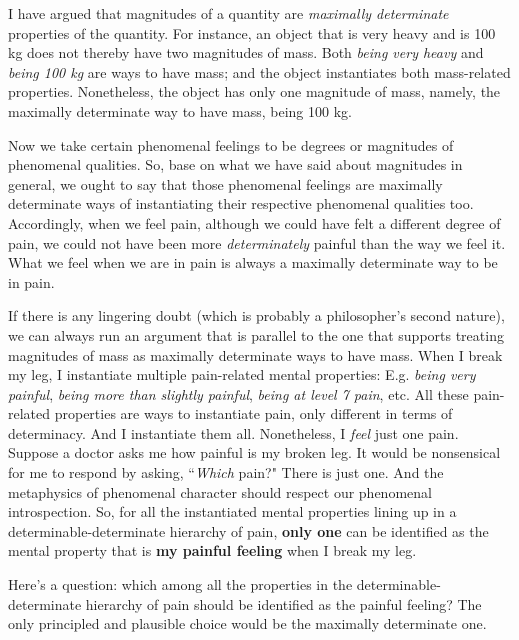 \documentclass[a4paper,12pt]{article}
\begin{document}
I have argued that magnitudes of a quantity are \emph{maximally determinate} properties of the quantity. For instance, an object that is very heavy and is 100 kg does not thereby have two magnitudes of mass. Both \emph{being very heavy} and \emph{being 100 kg} are ways to have mass; and the object instantiates both mass-related properties. Nonetheless, the object has only one magnitude of mass, namely, the maximally determinate way to have mass, being 100 kg.\footnotemark


Now we take certain phenomenal feelings to be degrees or magnitudes of phenomenal qualities. So, base on what we have said about magnitudes in general, we ought to say that those phenomenal feelings are maximally determinate ways of instantiating their respective phenomenal qualities too. Accordingly, when we feel pain, although we could have felt a different degree of pain, we could not have been more \emph{determinately} painful than the way we feel it. What we feel when we are in pain is always a maximally determinate way to be in pain.

If there is any lingering doubt (which is probably a philosopher's second nature), we can always run an argument that is parallel to the one that supports treating magnitudes of mass as maximally determinate ways to have mass. When I break my leg, I instantiate multiple pain-related mental properties: E.g. \emph{being very painful}, \emph{being more than slightly painful}, \emph{being at level 7 pain}, etc. All these pain-related properties are ways to instantiate pain, only different in terms of determinacy. And I instantiate them all. Nonetheless, I \emph{feel} just one pain. Suppose a doctor asks me how painful is my broken leg. It would be nonsensical for me to respond by asking, ``\emph{Which} pain?" There is just one. And the metaphysics of phenomenal character should respect our phenomenal introspection. So, for all the instantiated mental properties lining up in a determinable-determinate hierarchy of pain, \textbf{only one} can be identified as the mental property that is \textbf{my painful feeling} when I break my leg.

Here's a question: which among all the properties in the determinable-determinate hierarchy of pain should be identified as the painful feeling? The only principled and plausible choice would be the maximally determinate one.\footnotemark
\end{document}
